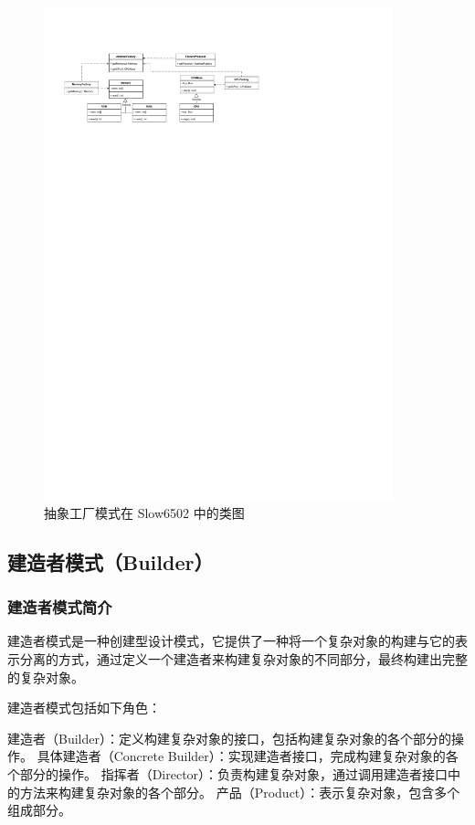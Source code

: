 \documentclass[cn,black,12pt,normal]{elegantnote}
\begin{document}
\begin{figure}[H]
  \centering
  \includegraphics[width=0.9\textwidth]{figures/抽象工厂.pdf}
  \caption{抽象工厂模式在 Slow6502 中的类图}
\end{figure}

\subsection{建造者模式（Builder）}

\subsubsection{建造者模式简介}

建造者模式是一种创建型设计模式，它提供了一种将一个复杂对象的构建与它的表示分离的方式，通过定义一个建造者来构建复杂对象的不同部分，最终构建出完整的复杂对象。

建造者模式包括如下角色：

建造者（Builder）：定义构建复杂对象的接口，包括构建复杂对象的各个部分的操作。
具体建造者（Concrete Builder）：实现建造者接口，完成构建复杂对象的各个部分的操作。
指挥者（Director）：负责构建复杂对象，通过调用建造者接口中的方法来构建复杂对象的各个部分。
产品（Product）：表示复杂对象，包含多个组成部分。
\end{document}
